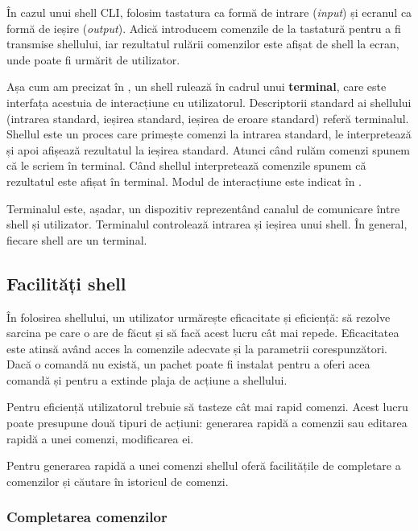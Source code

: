 În cazul unui shell CLI, folosim tastatura ca formă de intrare (\textit{input}) și ecranul ca formă de ieșire (\textit{output}).
Adică introducem comenzile de la tastatură pentru a fi transmise shellului, iar rezultatul rulării comenzilor este afișat de shell la ecran, unde poate fi urmărit de utilizator.

Așa cum am precizat în , un shell rulează în cadrul unui \textbf{terminal}, care este interfața acestuia de interacțiune cu utilizatorul.
Descriptorii standard ai shellului (intrarea standard, ieșirea standard, ieșirea de eroare standard) referă terminalul.
Shellul este un proces care primește comenzi la intrarea standard, le interpretează și apoi afișează rezultatul la ieșirea standard.
Atunci când rulăm comenzi spunem că le scriem în terminal.
Când shellul interpretează comenzile spunem că rezultatul este afișat în terminal.
Modul de interacțiune este indicat în .

Terminalul este, așadar, un dispozitiv reprezentând canalul de comunicare între shell și utilizator.
Terminalul controlează intrarea și ieșirea unui shell.
În general, fiecare shell are un terminal.

\subsection{Facilități shell}
\label{sec:cli:shell:features}

În folosirea shellului, un utilizator urmărește eficacitate și eficiență: să rezolve sarcina pe care o are de făcut și să facă acest lucru cât mai repede.
Eficacitatea este atinsă având acces la comenzile adecvate și la parametrii corespunzători.
Dacă o comandă nu există, un pachet poate fi instalat pentru a oferi acea comandă și pentru a extinde plaja de acțiune a shellului.

Pentru eficiență utilizatorul trebuie să tasteze cât mai rapid comenzi.
Acest lucru poate presupune două tipuri de acțiuni: generarea rapidă a comenzii sau editarea rapidă a unei comenzi, modificarea ei.

Pentru generarea rapidă a unei comenzi shellul oferă facilitățile de completare a comenzilor și căutare în istoricul de comenzi.

\subsubsection{Completarea comenzilor}
\label{sec:cli:shell:features:completion}

